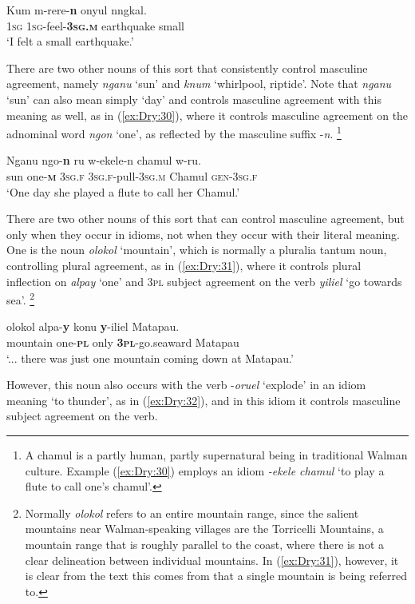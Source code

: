 \documentclass[output=collectionpaper]{langsci/langscibook}
\begin{document}
\ea \label{ex:Dry:29}
\gll Kum	m-rere-\textbf{n}	onyul	nngkal.\\
\textsc{1sg} \textsc{1sg}-feel-\textbf{\textsc{3sg.m}} earthquake small\\
\glt `I felt a small earthquake.'
\z

There are two other nouns of this sort that consistently control masculine agreement, namely \textit{nganu} `sun' and \textit{knum} `whirlpool, riptide'. Note that \textit{nganu} `sun' can also mean simply `day' and controls masculine agreement with this meaning as well, as in (\ref{ex:Dry:30}), where it controls masculine agreement on the adnominal word \textit{ngon} `one', as reflected by the masculine suffix -\textit{n}.%
\footnote{A chamul is a partly human, partly supernatural being in traditional Walman culture. Example (\ref{ex:Dry:30}) employs an idiom \textit{{}-ekele chamul} `to play a flute to call one's chamul'.}

\ea \label{ex:Dry:30}
\gll Nganu	ngo-\textbf{n}	ru	w-ekele-n	chamul w-ru.\\
sun one-\textbf{\textsc{m}} \textsc{3sg.f} \textsc{3sg.f}-pull-\textsc{3sg.m} Chamul \textsc{gen}-\textsc{3sg.f}\\
\glt `One day she played a flute to call her Chamul.'
\z

There are two other nouns of this sort that can control masculine agreement, but only when they occur in idioms, not when they occur with their literal meaning. One is the noun \textit{olokol} `mountain', which is normally a pluralia tantum noun, controlling plural agreement, as in (\ref{ex:Dry:31}), where it controls plural inflection on \textit{alpay} `one' and \textsc{3pl} subject agreement on the verb \textit{yiliel} `go towards sea'.%
\footnote{Normally \textit{olokol} refers to an entire mountain range, since the salient mountains near Walman-speaking villages are the Torricelli Mountains, a mountain range that is roughly parallel to the coast, where there is not a clear delineation between individual mountains. In (\ref{ex:Dry:31}), however, it is clear from the text this comes from that a single mountain is being referred to.}

\ea \label{ex:Dry:31}
\gll {\ldots}	olokol	alpa-\textbf{y}	konu	\textbf{y}-iliel	Matapau. \\
{} mountain one-\textbf{\textsc{pl}} only \textbf{\textsc{3pl}}-go.seaward Matapau\\
\glt `... there was just one mountain coming down at Matapau.'
\z

However, this noun also occurs with the verb -\textit{oruel} `explode' in an idiom meaning `to thunder', as in (\ref{ex:Dry:32}), and in this idiom it controls masculine subject agreement on the verb.
\end{document}
